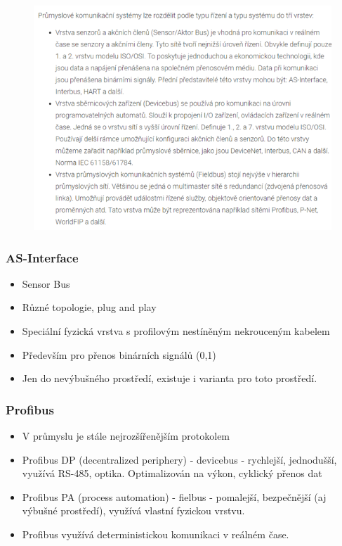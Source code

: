 \begin{figure}[!h]
    \begin{center}
        \includegraphics[scale = 1]{img/Picture18.png}
    \end{center}
\end{figure}

\newpage

\subsubsection*{AS-Interface}
\begin{itemize}
    \item Sensor Bus
    \item Různé topologie, plug and play
    \item Speciální fyzická vrstva s profilovým nestíněným nekrouceným kabelem
    \item Především pro přenos binárních signálů (0,1)
    \item Jen do nevýbušného prostředí, existuje i varianta pro toto prostředí.
\end{itemize}

\subsubsection*{Profibus}

\begin{itemize}
    \item V průmyslu je stále nejrozšířenějším protokolem
    \item Profibus DP (decentralized periphery) - devicebus - rychlejší, jednodušší, využívá RS-485, optika. Optimalizován na výkon, cyklický přenos dat
    \item Profibus PA (process automation) - fielbus - pomalejší, bezpečnější (aj výbušné prostředí), využívá vlastní fyzickou vrstvu.
    \item Profibus využívá deterministickou komunikaci v reálném čase.
\end{itemize}

